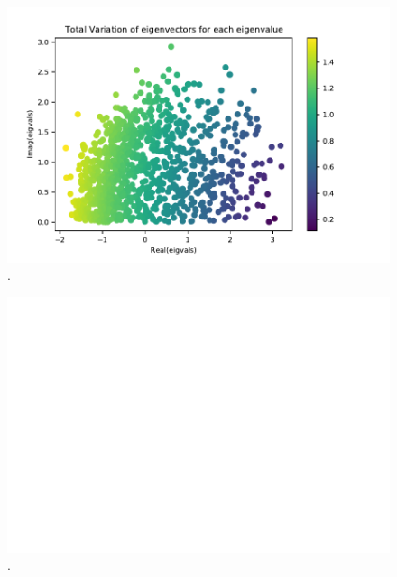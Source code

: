 \begin{figure}
	\centering
	\includegraphics[width=0.7\linewidth]{thesis/Figures/us_counties_qgsp_tv1.pdf}
	\caption{.}
	\label{fig:us_counties_qgsp_tv1}
\end{figure}

\begin{figure}
	\centering
	\includegraphics[width=0.7\linewidth]{thesis/Figures/us_counties_qgsp_spectrumsig.pdf}
	\caption{.}
	\label{fig:us_counties_qgsp_spectrumsig}
\end{figure}